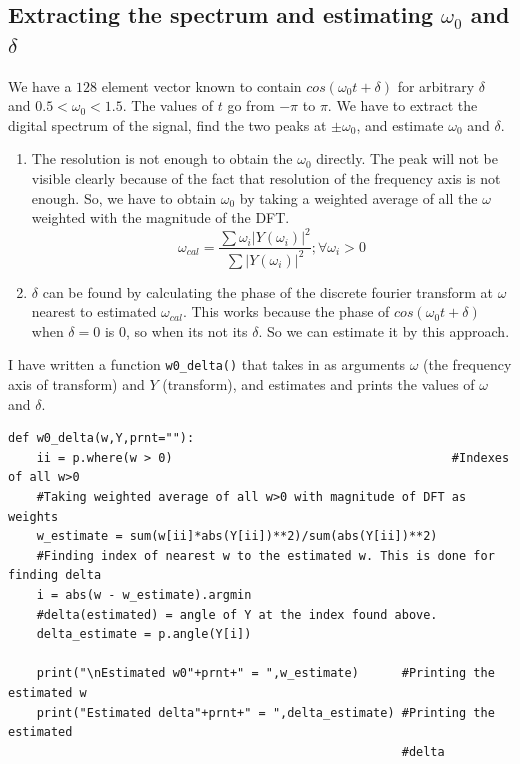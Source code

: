 \documentclass[11pt, a4paper]{article}
\begin{document}
    \subsection{Extracting the spectrum and estimating $\omega_0$ and $\delta$}
    We have a $128$ element vector known to contain $cos(\omega_0 t + \delta)$ for arbitrary $\delta$ and $0.5 < \omega_0 < 1.5$. The values of $t$ go from $-\pi$ to $\pi$. We have to extract the digital spectrum of the signal, find the two peaks at $\pm \omega_0$, and estimate $\omega_0$ and $\delta$.
        \begin{enumerate}
        \item The resolution is not enough to obtain the $\omega_0$ directly. The peak will not be visible clearly because of the fact that resolution of the frequency axis is not enough. So, we have to obtain $\omega_0$ by taking a weighted average of all the $\omega$ weighted with the magnitude of the DFT.
            \begin{equation}
\omega_{cal} = \frac{\sum \omega_i \lvert{Y(\omega_i)}\rvert^2}{\sum \lvert{Y(\omega_i)}\rvert^2} ; \forall \omega_i > 0
            \end{equation}
        \item $\delta$ can be found by calculating the phase of the discrete fourier transform at $\omega$ nearest to estimated $\omega_{cal}$. This works because the phase of $cos(\omega_0 t + \delta)$ when $\delta = 0$ is $0$, so when its not its $\delta$. So we can estimate it by this approach.
        \end{enumerate}
    I have written a function \texttt{w0\_delta()} that takes in as arguments $\omega$ (the frequency axis of transform) and $Y$ (transform), and estimates and prints the values of $\omega$ and $\delta$.
        \begin{verbatim}
def w0_delta(w,Y,prnt=""):
    ii = p.where(w > 0)                                       #Indexes of all w>0
    #Taking weighted average of all w>0 with magnitude of DFT as weights
    w_estimate = sum(w[ii]*abs(Y[ii])**2)/sum(abs(Y[ii])**2)
    #Finding index of nearest w to the estimated w. This is done for finding delta
    i = abs(w - w_estimate).argmin
    #delta(estimated) = angle of Y at the index found above.
    delta_estimate = p.angle(Y[i])
    
    print("\nEstimated w0"+prnt+" = ",w_estimate)      #Printing the estimated w
    print("Estimated delta"+prnt+" = ",delta_estimate) #Printing the estimated
                                                       #delta
        \end{verbatim}
\end{document}
